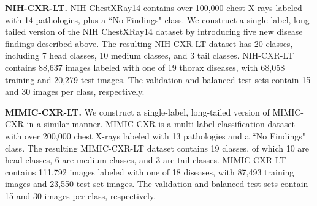 \documentclass[runningheads]{llncs}
\begin{document}
\textbf{NIH-CXR-LT.} NIH ChestXRay14 contains over 100,000 chest X-rays labeled with 14 pathologies, plus a ``No Findings" class. We construct a single-label, long-tailed version of the NIH ChestXRay14 dataset by introducing five new disease findings described above. The resulting NIH-CXR-LT dataset has 20 classes, including 7 head classes, 10 medium classes, and 3 tail classes. NIH-CXR-LT contains 88,637 images labeled with one of 19 thorax diseases, with 68,058 training and 20,279 test  images. The validation and balanced test sets contain 15 and 30 images per class, respectively.

\textbf{MIMIC-CXR-LT.} We construct a single-label, long-tailed version of MIMIC-CXR in a similar manner. MIMIC-CXR is a multi-label classification dataset with over 200,000 chest X-rays labeled with 13 pathologies and a ``No Findings" class. The resulting MIMIC-CXR-LT dataset contains 19 classes, of which 10 are head classes, 6 are medium classes, and 3 are tail classes. MIMIC-CXR-LT contains 111,792 images labeled with one of 18 diseases, with 87,493 training images and 23,550 test set images. The validation and balanced test sets contain 15 and 30 images per class, respectively.
\end{document}
